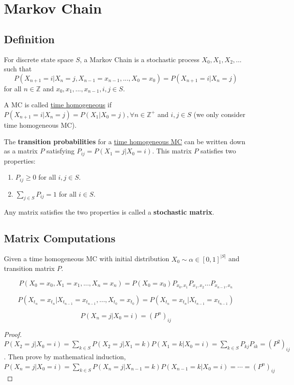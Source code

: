 \documentclass[11pt]{elegantbook}
\begin{document}
\chapter{Markov Chain}
\section{Definition}
For discrete state space $S$, a Markov Chain is a stochastic process $X_0,X_1,X_2,...$   such that$$P(X_{n+1}=i|X_n=j,X_{n-1}=x_{n-1},...,X_0=x_0)=P(X_{n+1}=i|X_n=j)$$
for all $n\in \mathbb{Z}$ and $x_0,x_1,...,x_{n-1},i,j\in S$.

A MC is called \underline{time homogeneous} if $P(X_{n+1}=i|X_n=j)=P(X_1|X_0=j),\forall n\in \mathbb{Z}^+$ and $i,j\in S$ (we only consider time homogeneous MC).

The \textbf{transition probabilities} for a \underline{time homogeneous MC} can be written down as a matrix $P$ satisfying $P_{ij} = P (X_1 = j|X_0 = i)$. This matrix $P$ satisfies two properties:
\begin{enumerate}[(1)]
    \item $P_{ij}\geq 0$ for all $i,j\in S$.
    \item $\sum_{j\in S}P_{ij}=1$ for all $i\in S$.
\end{enumerate}
Any matrix satisfies the two properties is called a \textbf{stochastic matrix}.

\section{Matrix Computations}
Given a time homogeneous MC with initial distribution $X_0\sim\alpha\in [0,1]^{|S|}$ and transition matrix $P$.
\begin{lemma}
$$P(X_0=x_0,X_1=x_1,...,X_n=x_n)=P(X_0=x_0)P_{x_0,x_1}P_{x_1,x_2}...P_{x_{n-1},x_n}$$
\end{lemma}

\begin{lemma}
    $$P(X_{t_n}=x_{t_n} | X_{t_{n-1}}=x_{t_{n-1}},...,X_{t_0}=x_{t_0})=P(X_{t_n}=x_{t_n}|X_{t_{n-1}}=x_{t_{n-1}})$$
\end{lemma}

\begin{lemma}
$$P(X_n=j|X_0=i)=(P^n)_{ij}$$
\end{lemma}
\begin{proof}
    $P(X_2=j|X_0=i)=\sum_{k\in S}P(X_2=j|X_1=k)P(X_1=k|X_0=i)=\sum_{k\in S}P_{kj}P_{ik}=(P^2)_{ij}$. Then prove by mathematical induction,
    $P(X_n=j|X_0=i)=\sum_{k\in S}P(X_n=j|X_{n-1}=k)P(X_{n-1}=k|X_0=i)=\cdots =(P^n)_{ij}$
\end{proof}
\end{document}

